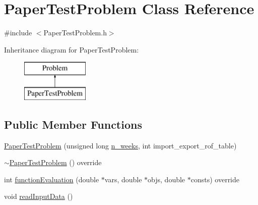 \hypertarget{classPaperTestProblem}{}\section{Paper\+Test\+Problem Class Reference}
\label{classPaperTestProblem}


{\ttfamily \#include $<$Paper\+Test\+Problem.\+h$>$}

Inheritance diagram for Paper\+Test\+Problem\+:\begin{figure}[H]
\begin{center}
\leavevmode
\includegraphics[height=2.000000cm]{classPaperTestProblem}
\end{center}
\end{figure}
\subsection*{Public Member Functions}
\begin{DoxyCompactItemize}
\item 
\mbox{\hyperlink{classPaperTestProblem_acc053a5b4515f3959494ce58c763d582}{Paper\+Test\+Problem}} (unsigned long \mbox{\hyperlink{classProblem_ac7513bb0ecdfa4bbb7d2ada3595d71ec}{n\+\_\+weeks}}, int import\+\_\+export\+\_\+rof\+\_\+table)
\item 
\mbox{\hyperlink{classPaperTestProblem_a571a92266d4c58ebc27e20391f7ad81b}{$\sim$\+Paper\+Test\+Problem}} () override
\item 
int \mbox{\hyperlink{classPaperTestProblem_a6db78df74d40f69a750b164caaca75c7}{function\+Evaluation}} (double $\ast$vars, double $\ast$objs, double $\ast$consts) override
\item 
void \mbox{\hyperlink{classPaperTestProblem_ae4bcc17d6ceab628f88174306d54fdc9}{read\+Input\+Data}} ()
\end{DoxyCompactItemize}
